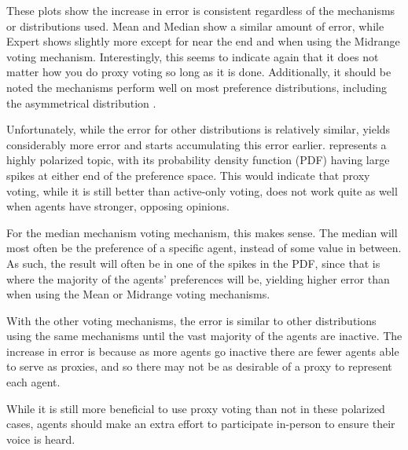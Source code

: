 These plots show the increase in error is consistent regardless of the mechanisms or
distributions used.
Mean and Median show a similar amount of error, while Expert shows slightly more
except for near the end and when using the Midrange voting mechanism.
Interestingly, this seems to indicate again that it does not matter how you do proxy
voting so long as it is done.
Additionally, it should be noted the mechanisms perform well on most preference
distributions, including the asymmetrical distribution .

Unfortunately, while the error for other distributions is relatively similar,
 yields considerably more error and starts accumulating
this error earlier.
 represents a highly polarized topic, with its probability
density function (PDF) having large spikes at either end of the preference space.
This would indicate that proxy voting, while it is still better than active-only
voting, does not work quite as well when agents have stronger, opposing opinions.

For the median mechanism voting mechanism, this makes sense.
The median will most often be the preference of a specific agent, instead of some
value in between.
As such, the result will often be in one of the spikes in the PDF, since that is
where the majority of the agents' preferences will be, yielding higher error than when
using the Mean or Midrange voting mechanisms.

With the other voting mechanisms, the error is similar to other distributions using
the same mechanisms until the vast majority of the agents are inactive.
The increase in error is because as more agents go inactive there are fewer agents able
to serve as proxies, and so there may not be as desirable of a proxy to represent
each agent.

While it is still more beneficial to use proxy voting than not in these polarized
cases, agents should make an extra effort to participate in-person to ensure their
voice is heard.

